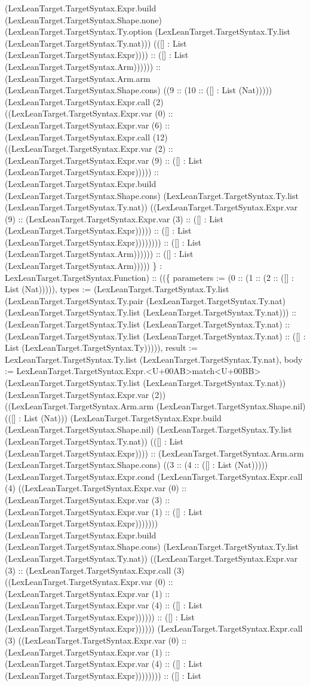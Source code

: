 \documentclass[11pt]{article}
\begin{document}
(LexLeanTarget.TargetSyntax.Expr.build (LexLeanTarget.TargetSyntax.Shape.none) (LexLeanTarget.TargetSyntax.Ty.option (LexLeanTarget.TargetSyntax.Ty.list (LexLeanTarget.TargetSyntax.Ty.nat))) (([] : List (LexLeanTarget.TargetSyntax.Expr)))) :: ([] : List (LexLeanTarget.TargetSyntax.Arm)))))) :: (LexLeanTarget.TargetSyntax.Arm.arm (LexLeanTarget.TargetSyntax.Shape.cons) ((9 :: (10 :: ([] : List (Nat))))) (LexLeanTarget.TargetSyntax.Expr.call (2) ((LexLeanTarget.TargetSyntax.Expr.var (0) :: (LexLeanTarget.TargetSyntax.Expr.var (6) :: (LexLeanTarget.TargetSyntax.Expr.call (12) ((LexLeanTarget.TargetSyntax.Expr.var (2) :: (LexLeanTarget.TargetSyntax.Expr.var (9) :: ([] : List (LexLeanTarget.TargetSyntax.Expr))))) :: (LexLeanTarget.TargetSyntax.Expr.build (LexLeanTarget.TargetSyntax.Shape.cons) (LexLeanTarget.TargetSyntax.Ty.list (LexLeanTarget.TargetSyntax.Ty.nat)) ((LexLeanTarget.TargetSyntax.Expr.var (9) :: (LexLeanTarget.TargetSyntax.Expr.var (3) :: ([] : List (LexLeanTarget.TargetSyntax.Expr))))) :: ([] : List (LexLeanTarget.TargetSyntax.Expr)))))))) :: ([] : List (LexLeanTarget.TargetSyntax.Arm)))))) :: ([] : List (LexLeanTarget.TargetSyntax.Arm))))) \} : LexLeanTarget.TargetSyntax.Function) :: ((\{ parameters := (0 :: (1 :: (2 :: ([] : List (Nat))))), types := (LexLeanTarget.TargetSyntax.Ty.list (LexLeanTarget.TargetSyntax.Ty.pair (LexLeanTarget.TargetSyntax.Ty.nat) (LexLeanTarget.TargetSyntax.Ty.list (LexLeanTarget.TargetSyntax.Ty.nat))) :: (LexLeanTarget.TargetSyntax.Ty.list (LexLeanTarget.TargetSyntax.Ty.nat) :: (LexLeanTarget.TargetSyntax.Ty.list (LexLeanTarget.TargetSyntax.Ty.nat) :: ([] : List (LexLeanTarget.TargetSyntax.Ty))))), result := LexLeanTarget.TargetSyntax.Ty.list (LexLeanTarget.TargetSyntax.Ty.nat), body := LexLeanTarget.TargetSyntax.Expr.<U+00AB>match<U+00BB> (LexLeanTarget.TargetSyntax.Ty.list (LexLeanTarget.TargetSyntax.Ty.nat)) (LexLeanTarget.TargetSyntax.Expr.var (2)) ((LexLeanTarget.TargetSyntax.Arm.arm (LexLeanTarget.TargetSyntax.Shape.nil) (([] : List (Nat))) (LexLeanTarget.TargetSyntax.Expr.build (LexLeanTarget.TargetSyntax.Shape.nil) (LexLeanTarget.TargetSyntax.Ty.list (LexLeanTarget.TargetSyntax.Ty.nat)) (([] : List (LexLeanTarget.TargetSyntax.Expr)))) :: (LexLeanTarget.TargetSyntax.Arm.arm (LexLeanTarget.TargetSyntax.Shape.cons) ((3 :: (4 :: ([] : List (Nat))))) (LexLeanTarget.TargetSyntax.Expr.cond (LexLeanTarget.TargetSyntax.Expr.call (4) ((LexLeanTarget.TargetSyntax.Expr.var (0) :: (LexLeanTarget.TargetSyntax.Expr.var (3) :: (LexLeanTarget.TargetSyntax.Expr.var (1) :: ([] : List (LexLeanTarget.TargetSyntax.Expr))))))) (LexLeanTarget.TargetSyntax.Expr.build (LexLeanTarget.TargetSyntax.Shape.cons) (LexLeanTarget.TargetSyntax.Ty.list (LexLeanTarget.TargetSyntax.Ty.nat)) ((LexLeanTarget.TargetSyntax.Expr.var (3) :: (LexLeanTarget.TargetSyntax.Expr.call (3) ((LexLeanTarget.TargetSyntax.Expr.var (0) :: (LexLeanTarget.TargetSyntax.Expr.var (1) :: (LexLeanTarget.TargetSyntax.Expr.var (4) :: ([] : List (LexLeanTarget.TargetSyntax.Expr)))))) :: ([] : List (LexLeanTarget.TargetSyntax.Expr)))))) (LexLeanTarget.TargetSyntax.Expr.call (3) ((LexLeanTarget.TargetSyntax.Expr.var (0) :: (LexLeanTarget.TargetSyntax.Expr.var (1) :: (LexLeanTarget.TargetSyntax.Expr.var (4) :: ([] : List (LexLeanTarget.TargetSyntax.Expr)))))))) :: ([] : List 
\end{document}
